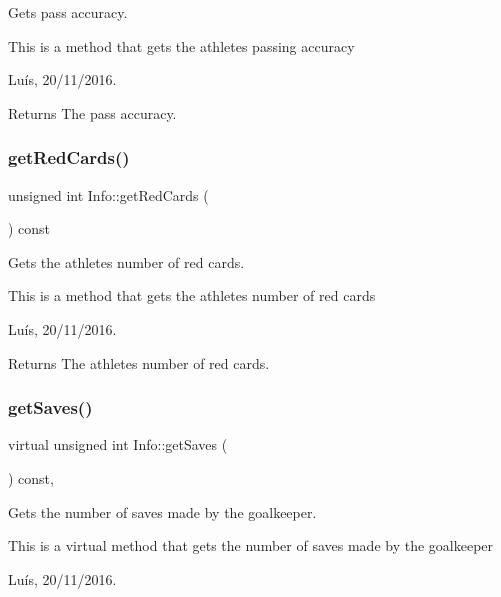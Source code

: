 Gets pass accuracy. 

This is a method that gets the athlete\textquotesingle{}s passing accuracy

Luís, 20/11/2016. 

\begin{DoxyReturn}{Returns}
The pass accuracy. 
\end{DoxyReturn}
\hypertarget{class_info_aac0891ef0f8767df1b5782ed108610de}{}\label{class_info_aac0891ef0f8767df1b5782ed108610de} 
\subsubsection{\texorpdfstring{get\+Red\+Cards()}{getRedCards()}}
{\footnotesize\ttfamily unsigned int Info\+::get\+Red\+Cards (\begin{DoxyParamCaption}{ }\end{DoxyParamCaption}) const}



Gets the athlete\textquotesingle{}s number of red cards. 

This is a method that gets the athlete\textquotesingle{}s number of red cards

Luís, 20/11/2016. 

\begin{DoxyReturn}{Returns}
The athlete\textquotesingle{}s number of red cards. 
\end{DoxyReturn}
\hypertarget{class_info_a2d7c53d322a705aaeb08fb79f9ef5211}{}\label{class_info_a2d7c53d322a705aaeb08fb79f9ef5211} 
\subsubsection{\texorpdfstring{get\+Saves()}{getSaves()}}
{\footnotesize\ttfamily virtual unsigned int Info\+::get\+Saves (\begin{DoxyParamCaption}{ }\end{DoxyParamCaption}) const\hspace{0.3cm}{\ttfamily [inline]}, {\ttfamily [virtual]}}



Gets the number of saves made by the goalkeeper. 

This is a virtual method that gets the number of saves made by the goalkeeper

Luís, 20/11/2016. 

